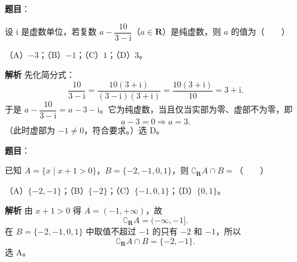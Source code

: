 
\begin{answer}

\textbf{题目}：

设 $\mathrm i$ 是虚数单位，若复数 $a-\dfrac{10}{3-\mathrm i}$（$a\in\mathbf R$）是纯虚数，则 $a$ 的值为\mbox{（　　）}

（A）$-3$；（B）$-1$；（C）$1$；（D）$3$。

\textbf{解析}
先化简分式：
\nopagebreak[4]
\[\frac{10}{3-\mathrm i}=\frac{10(3+\mathrm i)}{(3-\mathrm i)(3+\mathrm i)}=\frac{10(3+\mathrm i)}{10}=3+\mathrm i.\]
于是 $a-\dfrac{10}{3-\mathrm i}=a-3-\mathrm i$。它为纯虚数，当且仅当实部为零、虚部不为零，即
\nopagebreak[4]
\[a-3=0\Longrightarrow a=3.\]
（此时虚部为 $-1\neq0$，符合要求。）选 D。


\end{answer}
\begin{answer}

\textbf{题目}：

已知 $A=\{x\mid x+1>0\}$，$B=\{-2,-1,0,1\}$，则 $\complement_{\mathbf R}A\cap B=$\mbox{（　　）}

（A）$\{-2,-1\}$；（B）$\{-2\}$；（C）$\{-1,0,1\}$；（D）$\{0,1\}$。

\textbf{解析}
由 $x+1>0$ 得 $A=(-1,+\infty)$，故
\nopagebreak[4]
\[\complement_{\mathbf R}A=(-\infty,-1].\]
在 $B=\{-2,-1,0,1\}$ 中取值不超过 $-1$ 的只有 $-2$ 和 $-1$，所以
\nopagebreak[4]
\[\complement_{\mathbf R}A\cap B=\{-2,-1\}.\]
选 A。


\end{answer}
